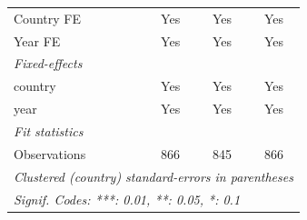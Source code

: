 \begin{table}[htbp]
\begin{tabular}{lccc}
      Country FE           & Yes            & Yes                  & Yes\\  
      Year FE              & Yes            & Yes                  & Yes\\  
      \midrule
      \emph{Fixed-effects}\\
      country              & Yes            & Yes                  & Yes\\  
      year                 & Yes            & Yes                  & Yes\\  
      \midrule
      \emph{Fit statistics}\\
      Observations         & 866            & 845                  & 866\\  
      \midrule \midrule
      \multicolumn{4}{l}{\emph{Clustered (country) standard-errors in parentheses}}\\
      \multicolumn{4}{l}{\emph{Signif. Codes: ***: 0.01, **: 0.05, *: 0.1}}\\
   \end{tabular}
\end{table}
